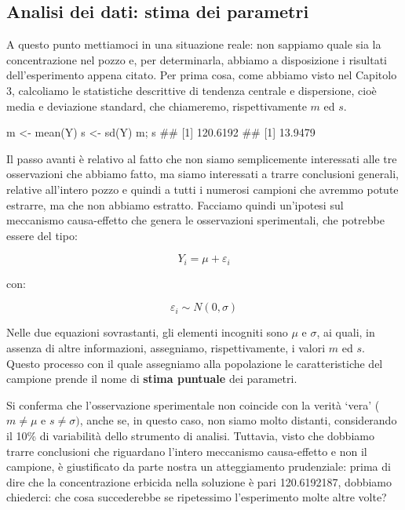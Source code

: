 \documentclass[a4paper,12pt,oneside]{book}
\newenvironment{Shaded}{\begin{snugshade}}{\end{snugshade}}
\newcommand{\DocumentationTok}[1]{#1}
\newcommand{\OtherTok}[1]{#1}
\newcommand{\FunctionTok}[1]{#1}
\newcommand{\NormalTok}[1]{#1}
\begin{document}
\hypertarget{analisi-dei-dati-stima-dei-parametri}{%
\subsection{Analisi dei dati: stima dei parametri}\label{analisi-dei-dati-stima-dei-parametri}}

A questo punto mettiamoci in una situazione reale: non sappiamo quale sia la concentrazione nel pozzo e, per determinarla, abbiamo a disposizione i risultati dell'esperimento appena citato. Per prima cosa, come abbiamo visto nel Capitolo 3, calcoliamo le statistiche descrittive di tendenza centrale e dispersione, cioè media e deviazione standard, che chiameremo, rispettivamente \(m\) ed \(s\).

\begin{Shaded}
\begin{Highlighting}[]
\NormalTok{m }\OtherTok{\textless{}{-}} \FunctionTok{mean}\NormalTok{(Y)}
\NormalTok{s }\OtherTok{\textless{}{-}} \FunctionTok{sd}\NormalTok{(Y)}
\NormalTok{m; s}
\DocumentationTok{\#\# [1] 120.6192}
\DocumentationTok{\#\# [1] 13.9479}
\end{Highlighting}
\end{Shaded}

Il passo avanti è relativo al fatto che non siamo semplicemente interessati alle tre osservazioni che abbiamo fatto, ma siamo interessati a trarre conclusioni generali, relative all'intero pozzo e quindi a tutti i numerosi campioni che avremmo potute estrarre, ma che non abbiamo estratto. Facciamo quindi un'ipotesi sul meccanismo causa-effetto che genera le osservazioni sperimentali, che potrebbe essere del tipo:

\[Y_i = \mu + \varepsilon_i\]

con:

\[\varepsilon_i \sim N(0, \sigma)\]

Nelle due equazioni sovrastanti, gli elementi incogniti sono \(\mu\) e \(\sigma\), ai quali, in assenza di altre informazioni, assegniamo, rispettivamente, i valori \(m\) ed \(s\). Questo processo con il quale assegniamo alla popolazione le caratteristiche del campione prende il nome di \textbf{stima puntuale} dei parametri.

Si conferma che l'osservazione sperimentale non coincide con la verità `vera' (\(m \neq \mu\) e \(s \neq \sigma)\), anche se, in questo caso, non siamo molto distanti, considerando il 10\% di variabilità dello strumento di analisi. Tuttavia, visto che dobbiamo trarre conclusioni che riguardano l'intero meccanismo causa-effetto e non il campione, è giustificato da parte nostra un atteggiamento prudenziale: prima di dire che la concentrazione erbicida nella soluzione è pari 120.6192187, dobbiamo chiederci: che cosa succederebbe se ripetessimo l'esperimento molte altre volte?
\end{document}
